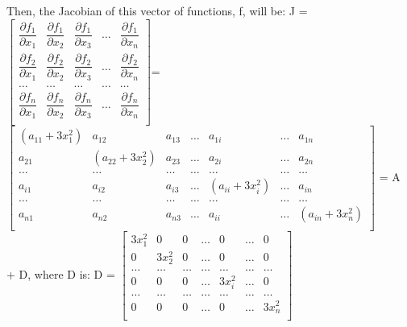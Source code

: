 \documentclass{article}
\begin{document}
Then, the Jacobian of this vector of functions, f, will be: \newline
J = $\begin{bmatrix}
	\dfrac{\partial f_1}{\partial x_1} & \dfrac{\partial f_1}{\partial x_2} & \dfrac{\partial f_1}{\partial x_3} & \dots & \dfrac{\partial f_1}{\partial x_n}\\
	\dfrac{\partial f_2}{\partial x_1} & \dfrac{\partial f_2}{\partial x_2} & \dfrac{\partial f_2}{\partial x_3} & \dots & \dfrac{\partial f_2}{\partial x_n}\\
	\dots & \dots & \dots & \dots & \dots \\
	\dfrac{\partial f_n}{\partial x_1} & \dfrac{\partial f_n}{\partial x_2} & \dfrac{\partial f_n}{\partial x_3} & \dots & \dfrac{\partial f_n}{\partial x_n}\\
\end{bmatrix}$\newline \newline = $\begin{bmatrix}
		(a_{11} + 3x_1^2) & a_{12} & a_{13} & \dots & a_{1i} & \dots & a_{1n} \\
		a_{21} & (a_{22} + 3x_2^2) & a_{23} & \dots & a_{2i} & \dots & a_{2n} \\
		\dots & \dots & \dots & \dots & \dots & \dots & \dots \\
		a_{i1} & a_{i2} & a_{i3} & \dots & (a_{ii} + 3x_i^2) & \dots & a_{in} \\
		\dots & \dots & \dots & \dots & \dots & \dots & \dots \\
		a_{n1} & a_{n2} & a_{n3} & \dots & a_{ii} & \dots & (a_{in} + 3x_n^2) \\
		 \end{bmatrix}$ = A + D, where D is: \newline \newline
		 D = $\begin{bmatrix}
			 3x_1^2 & 0 & 0 & \dots & 0 & \dots & 0 \\
			 0 & 3x_2^2 & 0 & \dots & 0 & \dots & 0 \\
			\dots & \dots & \dots & \dots & \dots & \dots & \dots \\
			 0 & 0 & 0 & \dots & 3x_i^2 & \dots & 0 \\
			\dots & \dots & \dots & \dots & \dots & \dots & \dots \\
			 0 & 0 & 0 & \dots & 0 & \dots & 3x_n^2 \\
		      \end{bmatrix}$ \newline
\end{document}
